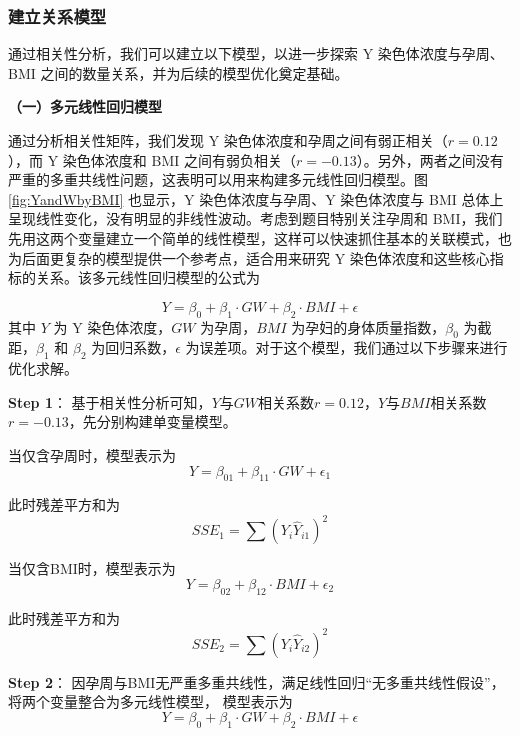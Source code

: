 \documentclass[withoutpreface,bwprint]{cumcmthesis} %
\begin{document}
\subsubsection{建立关系模型}
通过相关性分析，我们可以建立以下模型，以进一步探索 Y 染色体浓度与孕周、BMI 之间的数量关系，并为后续的模型优化奠定基础。

\textbf{（一）多元线性回归模型}

通过分析相关性矩阵，我们发现 Y 染色体浓度和孕周之间有弱正相关（$r=0.12$），而 Y 染色体浓度和 BMI 之间有弱负相关（$r=-0.13$）。另外，两者之间没有严重的多重共线性问题，这表明可以用来构建多元线性回归模型。图 \ref{fig:YandWbyBMI} 也显示，Y 染色体浓度与孕周、Y 染色体浓度与 BMI 总体上呈现线性变化，没有明显的非线性波动。考虑到题目特别关注孕周和 BMI，我们先用这两个变量建立一个简单的线性模型，这样可以快速抓住基本的关联模式，也为后面更复杂的模型提供一个参考点，适合用来研究 Y 染色体浓度和这些核心指标的关系。该多元线性回归模型的公式为

\begin{equation}
    Y = \beta_0 + \beta_1 \cdot GW + \beta_2 \cdot BMI + \epsilon
\end{equation}
其中 $Y$ 为 Y 染色体浓度，$GW$ 为孕周，$BMI$ 为孕妇的身体质量指数，$\beta_0$ 为截距，$\beta_1$ 和 $\beta_2$ 为回归系数，$\epsilon$ 为误差项。对于这个模型，我们通过以下步骤来进行优化求解。

\textbf{Step 1}： 
基于相关性分析可知，$Y$与$GW$相关系数$r=0.12$，$Y$与$BMI$相关系数$r=-0.13$，先分别构建单变量模型。

当仅含孕周时，模型表示为
\begin{equation}
    Y = \beta_{01} + \beta_{11} \cdot GW + \epsilon_1
\end{equation}

此时残差平方和为
\begin{equation}
    SSE_1 = \sum (Y_i \hat{Y}_{i1})^2
\end{equation}

当仅含BMI时，模型表示为
\begin{equation}
    Y = \beta_{02} + \beta_{12} \cdot BMI + \epsilon_2
\end{equation}

此时残差平方和为
\begin{equation}
    SSE_2 = \sum (Y_i \hat{Y}_{i2})^2
\end{equation}
    
\textbf{Step 2}：
因孕周与BMI无严重多重共线性，满足线性回归“无多重共线性假设”，将两个变量整合为多元线性模型，
模型表示为
\begin{equation}
    Y = \beta_0 + \beta_1 \cdot GW + \beta_2 \cdot BMI + \epsilon
\end{equation}
\end{document}
